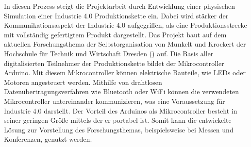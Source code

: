 In diesen Prozess steigt die Projektarbeit durch Entwicklung einer physischen Simulation einer Industrie 4.0 Produktionskette ein. Dabei wird stärker der Kommunikationsaspekt der Industrie 4.0 aufgegriffen, als eine Produktionsstrecke mit vollständig gefertigtem Produkt dargestellt. Das Projekt baut auf dem aktuellen Forschungsthema der Selbstorganisation von  Munkelt und Krockert der Hochschule für Technik und Wirtschaft Dresden (\citeyear{agents}) auf.
Die Basis aller digitalisierten Teilnehmer der Produktionskette bildet der Mikrocontroller Arduino. Mit diesem Mikrocontroller können elektrische Bauteile, wie LEDs oder Motoren angesteuert werden. Mithilfe von drahtlosen Datenübertragungsverfahren wie Bluetooth oder WiFi können die verwendeten Mikrocontroller untereinander kommunizieren, was eine Voraussetzung für Industrie 4.0 darstellt. Der Vorteil des Arduinos als Mikrocontroller besteht in seiner geringen Größe mittels der er portabel ist. Somit kann die entwickelte Lösung   zur Vorstellung des Forschungsthemas, beispielsweise bei Messen und Konferenzen, genutzt werden. 